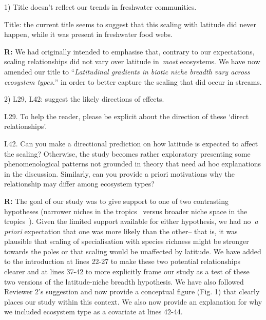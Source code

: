 \documentclass[12pt]{letter}
\newenvironment{refquote}{\bigskip \begin{it}}{\end{it}\smallskip}
\newcommand{\mytitle}{\emph{Latitudinal gradients in biotic niche breadth vary across ecosystem types.}}
\begin{document}
  1) Title doesn't reflect our trends in freshwater communities.

  \begin{refquote}

    Title: the current title seems to suggest that this scaling with latitude
    did never happen, while it was present in freshwater food webs.

  \end{refquote}


  \textbf{R:} We had originally intended to emphasise that, contrary to our expectations,
  scaling relationships did not vary over latitude in~\emph{most} ecosystems. We have now amended our
  title to ``\mytitle'' in order to better capture the scaling that did occur in streams.


  2) L29, L42: suggest the likely directions of effects.

  \begin{refquote}

    L29. To help the reader, please be explicit about the direction of these ‘direct relationships’.

    \smallskip

    L42. Can you make a directional prediction on how latitude is expected to
    affect the scaling? Otherwise, the study becomes rather exploratory
    presenting some phenomenological patterns not grounded in theory that need
    ad hoc explanations in the discussion. Similarly, can you provide a priori
    motivations why the relationship may differ among ecosystem types?

  \end{refquote}


  \textbf{R:} The goal of our study was to give support to
  one of two contrasting hypotheses (narrower niches in the
  tropics~\cite{Vazquez2004} versus broader niche space in 
  the tropics~\cite{Davies2007}). Given the limited support
  available for either hypothesis, we had no~\emph{a priori}
  expectation that one was more likely than the other-- that
  is, it was plausible that scaling of specialisation with
  species richness might be stronger towards the poles or 
  that scaling would be unaffected by latitude. We have 
  added to the introduction at lines 22-27 to make these two
  potential relationships clearer and at lines 37-42 to more
  explicitly frame our study as a test of these two versions 
  of the latitude-niche breadth hypothesis. We have also 
  followed Reviewer 2's suggestion and now provide a 
  conceptual figure (Fig. 1) that clearly places our study
  within this context. We also now provide an explanation 
  for why we included ecosystem type as a covariate at lines
  42-44.
 
\end{document}

